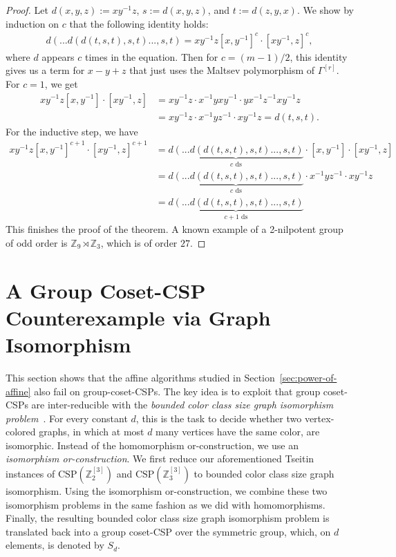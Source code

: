 \documentclass[a4paper,english, thm-restate]{lipics-v2021}
\newcommand{\ZZ}{\mathbb{Z}}
\newcommand{\CSP}[1]{\mathrm{CSP}(#1)}
\newcommand{\bbZ}{\mathbb{Z}}
\newcommand{\CosetGrpTmplt}[2]{#1^{[#2]}}
\newcommand{\Sym}[1]{S_{#1}}
\begin{document}
\begin{proof}
		Let $d(x,y,z) := xy^{-1}z$, $s:= d(x,y,z)$, and $t := d(z,y,x)$.
		We show by induction on $c$ that the following identity holds:
		\begin{align*}
			d(...d(d(t,s,t),s,t)...,s,t) = xy^{-1}z[x,y^{-1}]^{c} \cdot [xy^{-1},z]^{c},
		\end{align*}
		where $d$ appears $c$ times in the equation. Then for $c=(m-1)/2$, this identity gives us a term for $x-y+z$ that just uses the Maltsev polymorphism of $\CosetGrpTmplt{\Gamma}{r}$.
		For $c=1$, we get
		\begin{align*}
			xy^{-1}z[x,y^{-1}] \cdot [xy^{-1},z] &= xy^{-1}z \cdot x^{-1}yxy^{-1} \cdot  yx^{-1}z^{-1}xy^{-1}z\\
			&= xy^{-1}z \cdot x^{-1}yz^{-1} \cdot xy^{-1}z = d(t,s,t).
		\end{align*}
		For the inductive step, we have
		\begin{align*}
			xy^{-1}z[x,y^{-1}]^{c+1} \cdot [xy^{-1},z]^{c+1} &= \underbrace{d(...d(d(t,s,t),s,t)...,s,t)}_{c \text{ ds}} \cdot [x,y^{-1}] \cdot [xy^{-1},z]\\
			&=  \underbrace{d(...d(d(t,s,t),s,t)...,s,t)}_{c \text{ ds}} \cdot x^{-1}yz^{-1} \cdot xy^{-1}z\\
			&= \underbrace{d(...d(d(t,s,t),s,t)...,s,t)}_{c+1 \text{ ds}} 
		\end{align*}
		This finishes the proof of the theorem. A known example of a 2-nilpotent group of odd order is $\bbZ_9 \rtimes \bbZ_3$, which is of order $27$.
	\end{proof}	
	
	
	
	
	\section{A Group Coset-CSP Counterexample via Graph Isomorphism}
	\label{app:isomorphism}
	
	This section shows that the affine algorithms studied in Section~\ref{sec:power-of-affine} also fail on group-coset-CSPs.
	The key idea is to exploit that  group coset-CSPs are inter-reducible
	with the \emph{bounded color class size graph isomorphism problem}~\cite{BerkholzGrohe2017}.
	For every constant $d$, this is the task to decide whether two vertex-colored graphs, in which at most $d$ many vertices have the same color, are isomorphic.
	Instead of the homomorphism or-construction,
	we use an \emph{isomorphism or-construction}.
	We first reduce our aforementioned Tseitin instances of $\CSP{\CosetGrpTmplt{\ZZ_2}{3}}$ and
	$\CSP{\CosetGrpTmplt{\ZZ_3}{3}}$
	to bounded color class size graph isomorphism.
	Using the isomorphism or-construction, we combine these two isomorphism problems
	in the same fashion as we did with homomorphisms.
	Finally, the resulting bounded color class size graph isomorphism problem
	is translated back into a group coset-CSP over the symmetric group,
	which, on $d$ elements, is denoted by $\Sym{d}$.
	
\end{document}
